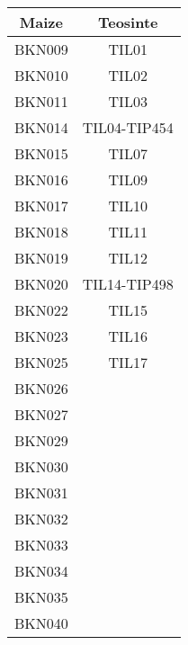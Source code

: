 \documentclass[12pt,letterpaper]{article}
\begin{document}
\begin{table}[h!]  
 \begin{center}
 \begin{tabular}{c|c}
   \bf Maize & \bf Teosinte \\ \hline \hline
   BKN009 &  TIL01 \\
   BKN010 & TIL02 \\
   BKN011 & TIL03 \\
   BKN014 & TIL04-TIP454 \\
   BKN015 & TIL07 \\
   BKN016 & TIL09 \\
   BKN017 & TIL10 \\
   BKN018 & TIL11 \\
   BKN019 & TIL12 \\
   BKN020 & TIL14-TIP498 \\
   BKN022 & TIL15 \\
   BKN023 & TIL16 \\
   BKN025 & TIL17 \\
   BKN026 & \\
   BKN027 & \\
   BKN029 & \\
   BKN030 & \\
   BKN031 & \\
   BKN032 & \\
   BKN033 & \\
   BKN034 & \\
   BKN035 & \\
   BKN040 & \\ \hline
 \end{tabular}
 \end{center}
\end{table}
\end{document}
